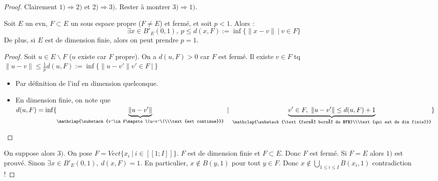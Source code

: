 \begin{proof}
    Clairement $1)\Rightarrow 2)$ et $2) \Rightarrow 3).$ Rester à montrer $3)\Rightarrow 1)$.
    
    \begin{lemme}[de Riesz]
        Soit $E$ un evn, $F\subset E$ un sous espace propre ($F\neq E$) et fermé, et soit $p<1.$ Alors : $$\exists x\in B'_E(0,1), \ p\le d(x,F):=\inf \{\|x-v\|\ |\ v\in F\} $$
        De plus, si $E$ est de dimension finie, alors on peut prendre $p=1$.
    \end{lemme}
    \begin{proof}
        Soit $u\in E\backslash F$ ($u$ existe car $F$ propre). On a $d(u,F)>0$ car $F$ est fermé. Il existe $v\in F$ tq $\|u-v\|\le \frac{1}{p}d(u,F):=\inf \{\|u-v'\|v'\in F\ |\ \} $
        \begin{itemize}
            \item Par définition de l'inf en dimension quelconque.
            \item En dimension finie, on note que $d(u,F)=\inf \{\underbrace{\|u-v'\|}_{\mathclap{\substack{v'\in F\mapsto \|u-v'\|\\\text{est continue}}}}\ |\ \underbrace{v'\in F,\ \|u-v'\|\le d(u,F)+1}_{\mathclap{\substack{\text{fermé borné de $F$}\\\text{qui est de dim finie}}}} \} $
        \end{itemize}
    \end{proof}
    On suppose alors $3)$. On pose $F=Vect \{x_i\ |\ i\in [\![1;I]\!]\} $. $F$ est de dimension finie et $F\subset E.$ Donc $F$ est fermé. Si $F=E$ alors $1)$ est prouvé. Sinon $\exists x\in B'_E(0,1),\ d(x,F)=1.$ En particulier, $x\not\in B(y,1)$ pour tout $y\in F.$ Donc $x\not\in \bigcup\limits_{1\le i\le I} B(x_i,1)$ contradiction !
\end{proof}
